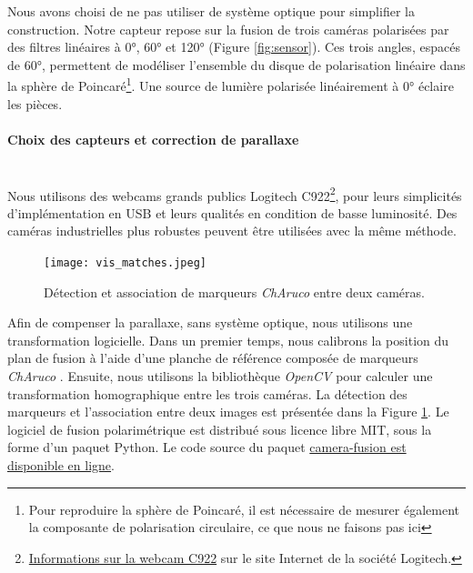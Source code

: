 Nous avons choisi de ne pas utiliser de système optique pour simplifier la construction.
Notre capteur repose sur la fusion de trois caméras polarisées par des filtres linéaires à 0°, 60° et 120° (Figure \ref{fig:sensor}).
Ces trois angles, espacés de 60°, permettent de modéliser l'ensemble du disque de polarisation linéaire dans la sphère de Poincaré\footnote{Pour reproduire la sphère de Poincaré, il est nécessaire de mesurer également la composante de polarisation circulaire, ce que nous ne faisons pas ici}.
Une source de lumière polarisée linéairement à 0° éclaire les pièces.


\paragraph{Choix des capteurs et correction de parallaxe}\mbox{} \\
Nous utilisons des webcams grands publics Logitech C922\footnote{\href{https://www.logitech.fr/fr-fr/product/c922-pro-stream-webcam}{Informations sur la webcam C922} sur le site Internet de la société Logitech.}, pour leurs simplicités d'implémentation en USB et leurs qualités en condition de basse luminosité.
Des caméras industrielles plus robustes peuvent être utilisées avec la même méthode.

\begin{figure}[tbhp]
	\centering
	\texttt{[image: vis\_matches.jpeg]}
	\caption{Détection et association de marqueurs \textit{ChAruco} entre deux caméras.}
	\label{fig:mecaruco}
\end{figure}

Afin de compenser la parallaxe, sans système optique, nous utilisons une transformation logicielle.
Dans un premier temps, nous calibrons la position du plan de fusion à l'aide d'une planche de référence composée de marqueurs \textit{ChAruco} \cite{garrido-jurado_automatic_2014, garrido-jurado_generation_2016, romero-ramirez_speeded_2018}.
Ensuite, nous utilisons la bibliothèque \textit{OpenCV} \cite{opencv_library} pour calculer une transformation homographique entre les trois caméras.
La détection des marqueurs et l'association entre deux images est présentée dans la Figure \ref{fig:mecaruco}.
Le logiciel de fusion polarimétrique est distribué sous licence libre MIT, sous la forme d'un paquet Python.
Le code source du paquet \href{https://github.com/a1rb4Ck/camera-fusion}{camera-fusion est disponible en ligne}.

